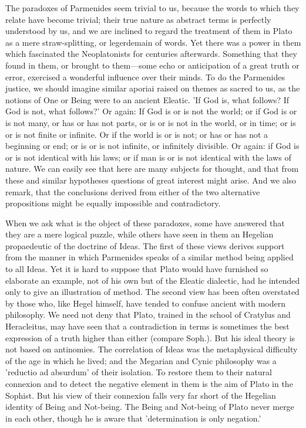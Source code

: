 \documentclass[11pt,letter]{article}
\begin{document}
\par  The paradoxes of Parmenides seem trivial to us, because the words to which they relate have become trivial; their true nature as abstract terms is perfectly understood by us, and we are inclined to regard the treatment of them in Plato as a mere straw-splitting, or legerdemain of words. Yet there was a power in them which fascinated the Neoplatonists for centuries afterwards. Something that they found in them, or brought to them—some echo or anticipation of a great truth or error, exercised a wonderful influence over their minds. To do the Parmenides justice, we should imagine similar aporiai raised on themes as sacred to us, as the notions of One or Being were to an ancient Eleatic. 'If God is, what follows? If God is not, what follows?' Or again: If God is or is not the world; or if God is or is not many, or has or has not parts, or is or is not in the world, or in time; or is or is not finite or infinite. Or if the world is or is not; or has or has not a beginning or end; or is or is not infinite, or infinitely divisible. Or again: if God is or is not identical with his laws; or if man is or is not identical with the laws of nature. We can easily see that here are many subjects for thought, and that from these and similar hypotheses questions of great interest might arise. And we also remark, that the conclusions derived from either of the two alternative propositions might be equally impossible and contradictory.

\par  When we ask what is the object of these paradoxes, some have answered that they are a mere logical puzzle, while others have seen in them an Hegelian propaedeutic of the doctrine of Ideas. The first of these views derives support from the manner in which Parmenides speaks of a similar method being applied to all Ideas. Yet it is hard to suppose that Plato would have furnished so elaborate an example, not of his own but of the Eleatic dialectic, had he intended only to give an illustration of method. The second view has been often overstated by those who, like Hegel himself, have tended to confuse ancient with modern philosophy. We need not deny that Plato, trained in the school of Cratylus and Heracleitus, may have seen that a contradiction in terms is sometimes the best expression of a truth higher than either (compare Soph.). But his ideal theory is not based on antinomies. The correlation of Ideas was the metaphysical difficulty of the age in which he lived; and the Megarian and Cynic philosophy was a 'reductio ad absurdum' of their isolation. To restore them to their natural connexion and to detect the negative element in them is the aim of Plato in the Sophist. But his view of their connexion falls very far short of the Hegelian identity of Being and Not-being. The Being and Not-being of Plato never merge in each other, though he is aware that 'determination is only negation.'
\end{document}
